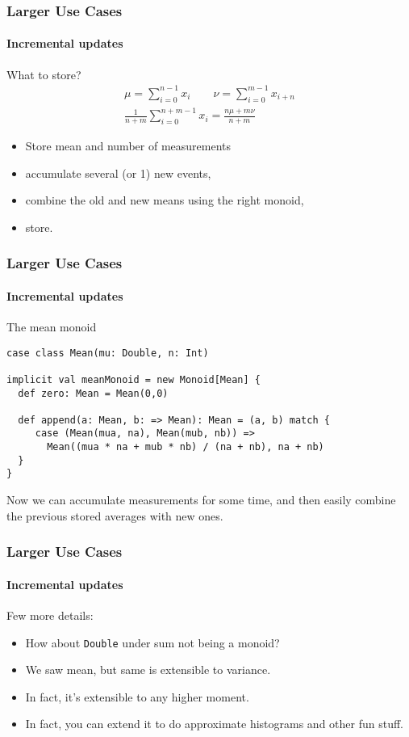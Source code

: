 \documentclass{beamer}
\begin{document}
\begin{frame}
  \frametitle{Larger Use Cases}
  \framesubtitle{Incremental updates}
  What to store?
  \[
  \begin{split}
    \mu = \sum_{i=0}^{n-1} x_i \qquad  \nu = \sum_{i=0}^{m-1} x_{i+n} \\
    \frac{1}{n+m} \sum_{i=0}^{n+m-1} x_i = \frac{n\mu + m\nu} {n+m}
  \end{split}
  \]

  \pause

  \begin{itemize}
  \item Store mean and number of measurements
  \item accumulate several (or 1) new events,
  \item combine the old and new means using the right \alert{monoid},
  \item store.
  \end{itemize}
\end{frame}

\begin{frame}[fragile]
  \frametitle{Larger Use Cases}
  \framesubtitle{Incremental updates}
  \begin{block}{The mean monoid}
  \begin{lstlisting}
case class Mean(mu: Double, n: Int)

implicit val meanMonoid = new Monoid[Mean] {
  def zero: Mean = Mean(0,0)

  def append(a: Mean, b: => Mean): Mean = (a, b) match {
     case (Mean(mua, na), Mean(mub, nb)) =>
       Mean((mua * na + mub * nb) / (na + nb), na + nb)
  }
}
  \end{lstlisting}
  \end{block}
  Now we can accumulate measurements for some time, and then easily
  combine the previous stored averages with new ones.
\end{frame}

\begin{frame}
  \frametitle{Larger Use Cases}
  \framesubtitle{Incremental updates}
  Few more details:
  \begin{itemize}
    \item How about \texttt{Double} under sum not being a monoid?
  \item We saw mean, but same is extensible to variance.
  \item In fact, it's extensible to any higher moment.
  \item In fact, you can extend it to do approximate histograms and other fun stuff.
  \end{itemize}

\end{frame}
\end{document}
